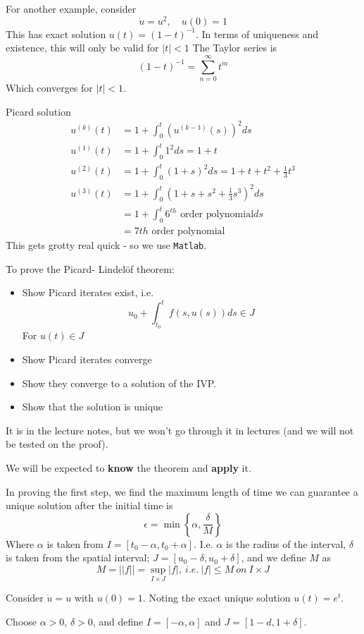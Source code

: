 \documentclass{X:/Documents/Coding/Latex/myassignment}
\begin{document}
For another example, consider 
\[\dot u = u^2,\quad u(0)=1\]
This has exact solution $u(t) = (1-t)^{-1}$.
In terms of uniqueness and existence, this will only be valid for $|t| <1$
The Taylor series is
\[(1-t)^{-1} = \sum_{n=0}^\infty t^m\]
Which converges for $|t|<1$.

Picard solution
\begin{align*}
    u^{(k)}(t) &= 1 + \int_0^t \left(u^{(k-1)}(s)\right)^2 ds\\
    u^{(1)}(t) &= 1 + \int_0^t 1^2 ds = 1 + t\\
    u^{(2)}(t) &= 1 + \int_0^t (1+s)^2 ds = 1 + t + t^2 + \frac13 t^3\\
    u^{(3)}(t) &= 1 + \int_0^t (1+s+s^2+\frac13 s^3)^2 ds\\
            &= 1 +\int_0^t 6^{th}\text{ order polynomial} ds\\
            &= 7{th}\text{ order polynomial}
\end{align*}
This gets grotty real quick - so we use \verb|Matlab|.

To prove the Picard- Lindel\"of theorem:
\begin{itemize}
    \item Show Picard iterates exist, i.e. 
    \[u_0 + \int_{t_0}^t f(s,u(s)) ds \in J\] 
    For $u(t) \in J$
    \item Show Picard iterates converge
    \item Show they converge to a solution of the IVP.
    \item Show that the solution is unique
\end{itemize}
It is in the lecture notes, but we won't go through it in lectures (and we will not be tested on the proof).

We will be expected to \textbf{know} the theorem and \textbf{apply} it.

In proving the first step, we find the maximum length of time we can guarantee a unique solution after the initial time is 
\[\epsilon = \min\left\{\alpha,\frac{\delta}{M}\right\}\]
Where $\alpha$ is taken from $I = [t_0 - \alpha, t_0 + \alpha]$. I.e. $\alpha$ is the radius of the interval, $\delta$ is taken from the spatial interval; $J = [u_0 - \delta, u_0 + \delta]$, and we define $M$ as
\[M = ||f|| = \sup_{I\times J} |f|, \ i.e. \ |f| \leq M \ on \ I\times J\]

Consider $\dot u = u$ with $u(0) =1$. Noting the exact unique solution $u(t) = e^t$.

Choose $\alpha >0$, $\delta > 0$, and define $I = [-\alpha,\alpha]$ and $J = [1-d    ,1+\delta]$.
\end{document}
